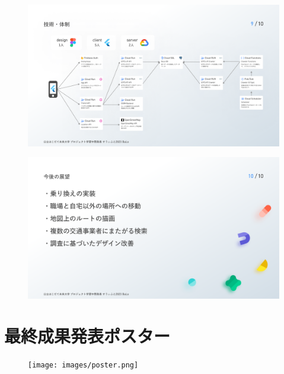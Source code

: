 \begin{figure}[htbp]
    \includegraphics[width=14cm]{images/slide9.png}
    \label{fig:slide9}
\end{figure}
\begin{figure}[htbp]
    \includegraphics[width=14cm]{images/slide10.png}
    \label{fig:slide10}
\end{figure}

\section{最終成果発表ポスター}
\begin{figure}[htbp]
    \centering
    \texttt{[image: images/poster.png]}
\end{figure}
